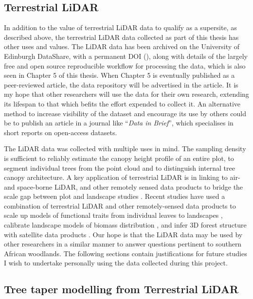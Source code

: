 \begin{refsection}
\section{Terrestrial LiDAR}

In addition to the value of terrestrial LiDAR data to qualify as a supersite, as described above, the terrestrial LiDAR data collected as part of this thesis has other uses and values. The LiDAR data has been archived on the University of Edinburgh DataShare, with a permanent DOI (), along with details of the largely free and open source reproducible workflow for processing the data, which is also seen in Chapter 5 of this thesis. When Chapter 5 is eventually published as a peer-reviewed article, the data repository will be advertised in the article. It is my hope that other researchers will use the data for their own research, extending its lifespan to that which befits the effort expended to collect it. An alternative method to increase visibility of the dataset and encourage its use by others could be to publish an article in a journal like ``\textit{Data in Brief}'', which specialises in short reports on open-access datasets.

The LiDAR data was collected with multiple uses in mind. The sampling density is sufficient to reliably estimate the canopy height profile of an entire plot, to segment individual trees from the point cloud and to distinguish internal tree canopy architecture. A key application of terrestrial LiDAR is in linking to air- and space-borne LiDAR, and other remotely sensed data products to bridge the scale gap between plot and landscape studies \citep{Xiao2019}. Recent studies have used a combination of terrestrial LiDAR and other remotely-sensed data products to scale up models of functional traits from individual leaves to landscapes \citep{AbelleiraMartinez2016}, calibrate landscape models of biomass distribution \citep{RejouMechain2019}, and infer 3D forest structure with satellite data products \citep{Fischer2020}. Our hope is that the LiDAR data may be used by other researchers in a similar manner to answer questions pertinent to southern African woodlands. The following sections contain justifications for future studies I wish to undertake personally using the data collected during this project.

\subsection{Tree taper modelling from Terrestrial LiDAR} \label{taper}


\end{refsection}
